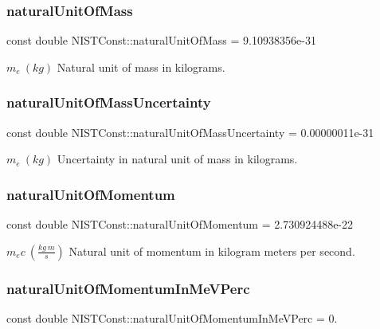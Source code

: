 \subsubsection{\texorpdfstring{natural\+Unit\+Of\+Mass}{naturalUnitOfMass}}
{\footnotesize\ttfamily const double N\+I\+S\+T\+Const\+::natural\+Unit\+Of\+Mass = 9.\+10938356e-\/31}

$m_e \ (kg)$ Natural unit of mass in kilograms. \mbox{\label{group___natural_unit_gabf96b874ece35b6b5ada8207d80bab73}} 
\subsubsection{\texorpdfstring{natural\+Unit\+Of\+Mass\+Uncertainty}{naturalUnitOfMassUncertainty}}
{\footnotesize\ttfamily const double N\+I\+S\+T\+Const\+::natural\+Unit\+Of\+Mass\+Uncertainty = 0.\+00000011e-\/31}

$m_e \ (kg)$ Uncertainty in natural unit of mass in kilograms. \mbox{\label{group___natural_unit_ga88a54043ec0c3a9de3d8549836044045}} 
\subsubsection{\texorpdfstring{natural\+Unit\+Of\+Momentum}{naturalUnitOfMomentum}}
{\footnotesize\ttfamily const double N\+I\+S\+T\+Const\+::natural\+Unit\+Of\+Momentum = 2.\+730924488e-\/22}

$m_e c \ (\frac{kg\ m}{s})$ Natural unit of momentum in kilogram meters per second. \mbox{\label{group___natural_unit_ga4ac7dedeaf24fa9d4baa8331a85ab4ca}} 
\subsubsection{\texorpdfstring{natural\+Unit\+Of\+Momentum\+In\+Me\+V\+Perc}{naturalUnitOfMomentumInMeVPerc}}
{\footnotesize\ttfamily const double N\+I\+S\+T\+Const\+::natural\+Unit\+Of\+Momentum\+In\+Me\+V\+Perc = 0.}

